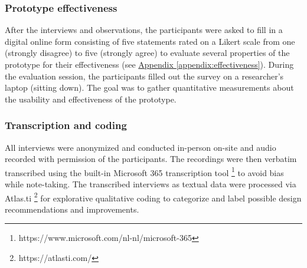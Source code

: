 \subsubsection{Prototype effectiveness}

After the interviews and observations, the participants were asked to fill in a digital online form consisting of five statements rated on a Likert scale from one (strongly disagree) to five (strongly agree) to evaluate several properties of the prototype for their effectiveness (see \hyperref[appendix:effectiveness]{Appendix \ref*{appendix:effectiveness}}). During the evaluation session, the participants filled out the survey on a researcher's laptop (sitting down). The goal was to gather quantitative measurements about the usability and effectiveness of the prototype.

\subsubsection{Transcription and coding}
All interviews were anonymized and conducted in-person on-site and audio recorded with permission of the participants. The recordings were then verbatim transcribed using the built-in Microsoft 365 transcription tool \footnote{https://www.microsoft.com/nl-nl/microsoft-365} to avoid bias while note-taking. The transcribed interviews as textual data were processed via Atlas.ti \footnote{https://atlasti.com/} for explorative qualitative coding to categorize and label possible design recommendations and improvements.